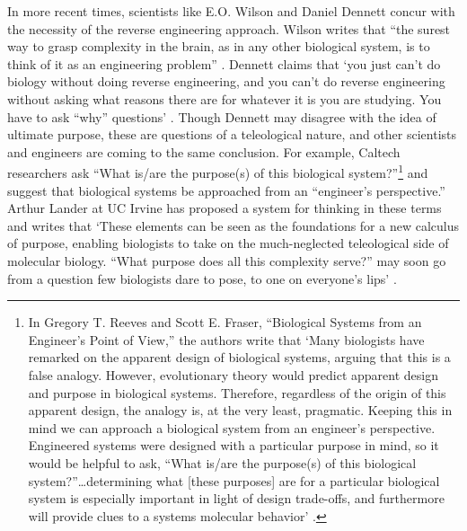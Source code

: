 In more recent times, scientists like E.O. Wilson and Daniel Dennett
concur with the necessity of the reverse engineering approach. Wilson
writes that “the surest way to grasp complexity in the brain, as in any
other biological system, is to think of it as an engineering
problem” \citep[][pg. 112]{wilson1998}. Dennett claims that ‘you just can’t do
biology without doing reverse engineering, and you can’t do reverse
engineering without asking what reasons there are for whatever it is
you are studying. You have to ask “why” questions’ \citep[][pg. 213]{dennett1996}.
Though Dennett may disagree with the idea of ultimate purpose, these
are questions of a teleological nature, and other scientists and
engineers are coming to the same conclusion. For example, Caltech
researchers ask “What is/are the purpose(s) of this biological
system?”\footnote{
In Gregory T. Reeves and Scott E. Fraser,
“Biological Systems from an Engineer’s Point of View,” 
the authors write that ‘Many biologists have remarked on the apparent
design of biological systems, arguing that this is a false analogy.
However, evolutionary theory would predict apparent design and purpose
in biological systems. Therefore, regardless of the origin of this
apparent design, the analogy is, at the very least, pragmatic. Keeping
this in mind we can approach a biological system from an engineer’s
perspective. Engineered systems were designed with a particular purpose
in mind, so it would be helpful to ask, ``What is/are the purpose(s) of
this biological system?''{\ldots}determining what [these purposes] are for a
particular biological system is especially important in light of design
trade-offs, and furthermore will provide clues to a systems molecular
behavior’ \citep{reevesfraser2009}.
} and suggest that biological systems be
approached from an “engineer’s perspective.” Arthur Lander at UC Irvine
has proposed a system for thinking in these terms and writes that
`These elements can be seen as the foundations for a new calculus of
purpose, enabling biologists to take on the much-neglected teleological
side of molecular biology. ``What purpose does all this complexity
serve?'' may soon go from a question few biologists dare to pose, to one
on everyone’s lips' \citep{lander2004}.

